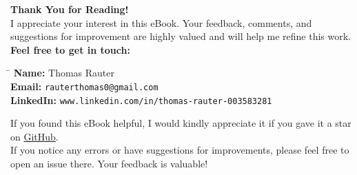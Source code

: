\documentclass[12pt,openany]{book}
\begin{document}
\begin{center}
    \vspace*{\fill}
    \Large{\textbf{Thank You for Reading!}}\\[1cm]
    \normalsize{
        I appreciate your interest in this eBook. Your feedback, comments, and suggestions for improvement are highly valued and will help me refine this work.
    }\\[0.5cm]
    \textbf{Feel free to get in touch:}\\[0.5cm]
    \begin{tabbing}
        \hspace{3cm} \= \hspace{6cm} \kill
        \textbf{Name:} \> Thomas Rauter \\
        \textbf{Email:} \> \texttt{rauterthomas0@gmail.com} \\
        \textbf{LinkedIn:} \> \texttt{www.linkedin.com/in/thomas-rauter-003583281} \\
    \end{tabbing}
    \normalsize{
        If you found this eBook helpful, I would kindly appreciate it if you gave it a star on \href{https://github.com/Thomas-Rauter/Navigating-Machine-Learning-Projects}{GitHub}.\\
        If you notice any errors or have suggestions for improvements, please feel free to open an issue there. Your feedback is valuable!
    }
    \\[1cm]
    \vspace*{\fill}
\end{center}
\end{document}
